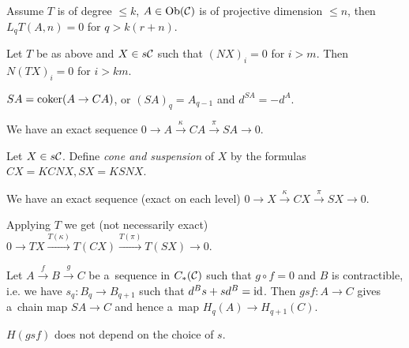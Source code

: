 



    \begin{theorem}
        Assume $T$ is of degree $\leq k$, 
        $A \in \operatorname{Ob}(\mathcal{C})$ is of projective dimension $\leq n$,
        then $L_qT(A,n) = 0$ for $q > k(r+n)$.
    \end{theorem}
    
    \begin{lemma}
        Let $T$ be as above and $X \in s\mathcal{C}$ such that
        $(NX)_i = 0$ for $i>m$.
        Then $N(TX)_i = 0$ for $i>km$.
    \end{lemma}
    
    \begin{definition}[suspension]
        $SA = \operatorname{coker}(A \to CA)$,
        or $(SA)_q = A_{q-1}$ and $d^{SA} = - d^A$.
    \end{definition}
    
    \begin{corollary}
        We have an exact sequence
        $0 \to A \xrightarrow \kappa CA \xrightarrow \pi SA \to 0$.
    \end{corollary}
    
    \begin{definition}
        Let $X \in s\mathcal{C}$. Define {\em cone and suspension} of $X$ by the formulas
        $CX = KCNX, SX = KSNX$.
    \end{definition}
    
    \begin{remark}
        We have an exact sequence (exact on each level)
        $0 \to X \xrightarrow \kappa CX \xrightarrow \pi SX \to 0$.
        
        Applying $T$ we get (not necessarily exact)
        $0 \to TX \xrightarrow{T(\kappa)} T(CX) \xrightarrow{T(\pi)}T(SX) \to 0$.
    \end{remark}
    
    \begin{remark}
        Let $A \xrightarrow f B \xrightarrow g C$ be a~sequence in $C_\ast(\mathcal{C})$
        such that $g \circ f = 0$ and $B$ is contractible,
        i.e. we have $s_q:B_q \to B_{q+1}$ such that $d^B s + sd^B = \mathrm{id}$.
        Then $gsf:A \to C$ gives a~chain map $SA \to C$
        and hence a~map $H_q(A) \to H_{q+1}(C)$.
    \end{remark}
    
    \begin{theorem}
        $H(gsf)$ does not depend on the choice of $s$.
    \end{theorem}
    
